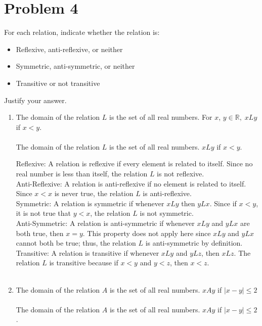 \documentclass{amsart}
\theoremstyle{definition}
\theoremstyle{Exercise}
\theoremstyle{remark}
\theoremstyle{rule}
\numberwithin{equation}{section}
\newcommand{\Real}{\mathbb R}
\begin{document}
\section*{Problem 4}

For each relation, indicate whether the relation is:
\begin{itemize}
  \item Reflexive, anti-reflexive, or neither
  \item Symmetric, anti-symmetric, or neither
  \item Transitive or not transitive
\end{itemize}
Justify your answer.\\
\begin{enumerate}[label=(\alph*)]
\item The domain of the relation $L$ is the set of all real numbers. For $x$, $y \in \Real, \; xLy$ if $x < y$.\\\\
The domain of the relation \( L \) is the set of all real numbers. \( xLy \) if \( x < y \).

Reflexive: A relation is reflexive if every element is related to itself. Since no real number is less than itself, the relation \( L \) is not reflexive.\\
Anti-Reflexive: A relation is anti-reflexive if no element is related to itself. Since \( x < x \) is never true, the relation \( L \) is anti-reflexive.\\
Symmetric: A relation is symmetric if whenever \( xLy \) then \( yLx \). Since if \( x < y \), it is not true that \( y < x \), the relation \( L \) is not symmetric.\\
Anti-Symmetric: A relation is anti-symmetric if whenever \( xLy \) and \( yLx \) are both true, then \( x = y \). This property does not apply here since \( xLy \) and \( yLx \) cannot both be true; thus, the relation \( L \) is anti-symmetric by definition.\\
Transitive: A relation is transitive if whenever \( xLy \) and \( yLz \), then \( xLz \). The relation \( L \) is transitive because if \( x < y \) and \( y < z \), then \( x < z \).
\\\\

\item The domain of the relation $A$ is the set of all real numbers. $xAy$ if $|x-y| \leq 2$\\\\
The domain of the relation \( A \) is the set of all real numbers. \( xAy \) if \( |x-y| \leq 2 \).


\end{enumerate}
\end{document}
